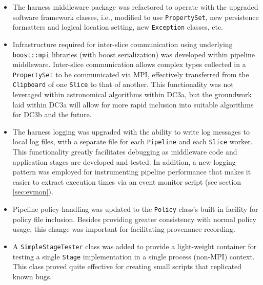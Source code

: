 \begin{itemize}
\item The harness middleware package was refactored to operate with
the upgraded software framework classes, i.e., modified to use 
{\tt PropertySet}, new persistence formatters and logical location setting,
new {\tt Exception} classes, etc.
\item Infrastructure required for inter-slice communication using
underlying {\tt boost::mpi} libraries (with boost serialization) was
developed within pipeline middleware.  Inter-slice communication
allows complex types collected in a {\tt PropertySet} to be
communicated via MPI, effectively transferred from the {\tt Clipboard}
of one {\tt Slice} to that of another.  This functionality was not
leveraged within astronomical algorithms within DC3a, but the
groundwork laid within DC3a will allow for more rapid inclusion into
suitable algorithms for DC3b and the future.
\item The harness logging was upgraded with the ability to write log
messages to local log files, with a separate file for each {\tt Pipeline}
and each {\tt Slice} worker.  This functionality greatly facilitates
debugging as middleware code and application stages are developed and
tested.  In addition, a new logging pattern was employed for
instrumenting pipeline performance that makes it easier to extract
execution times via an event monitor script (see
section \ref{sec:evmon}).  
\item Pipeline policy handling was updated to the {\tt Policy} class's
built-in facility for policy file inclusion.  Besides providing
greater consistency with normal policy usage, this change was
important for facilitating provenance recording.  
\item A {\tt SimpleStageTester} class was added to provide a
light-weight container for testing a single {\tt Stage} implementation
in a single process (non-MPI) context.  This class proved quite
effective for creating small scripts that replicated known bugs.  
\end{itemize}

